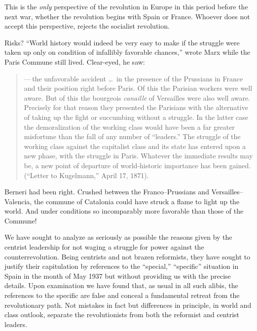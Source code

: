 This is the \emph{only} perspective of the revolution in Europe in this period before the next war, whether the revolution begins with Spain or France. Whoever does not accept this perspective, rejects the socialist revolution.

Risks? ``World history would indeed be very easy to make if the struggle were taken up only on condition of infallibly favorable chan\-ces,''
wrote Marx while the Paris Commune still lived.
Clear-eyed, he saw:

\begin{quotation}
  \noindent
  —\,the unfavorable accident \dots\ in the presence of the Prus\-sians in France and their position right before Paris. Of this the Parisian workers were well aware. But of this the bourgeois \emph{canaille} of Versailles were also well aware. Precisely for that reason they presented the Parisians with the alternative of taking up the fight or succumbing without a struggle. In the latter case the demoralization of the working class would have been a far greater misfortune than the fall of any number of “leaders.” The struggle of the working class against the capitalist class and its state has entered upon a new phase, with the struggle in Paris. Whatever the immediate results may be, a new point of departure of world-historic importance has been gained. (``Letter to Kugelmann,\kn\kn'' April 17, 1871).
\end{quotation}

Berneri had been right. Crushed between the Franco--Prussians and Versailles--Valencia, the commune of Catalonia could have struck a flame to light up the world. And under conditions so incomparably more favorable than those of the Commune!

We have sought to analyze as seriously as possible the reasons given by the centrist leadership for not waging a struggle for power against the counterrevolution. Being centrists and not brazen reformists, they have sought to justify their capitulation by references to the ``special,'' ``specific'' situation in Spain in the month of May 1937 but without providing us with the precise details. Upon examination we have found that, as usual in all such alibis, the references to the specific are false and conceal a fundamental retreat from the revolutionary path. Not mistakes in fact but differences in principle, in world and class outlook, separate the revolutionists from both the reformist and centrist leaders.

